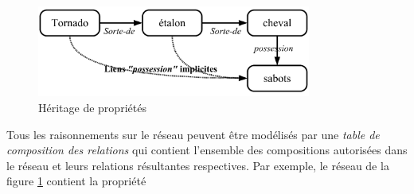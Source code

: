 \begin{figure}[htbp]
  \centering\includegraphics[height = 3cm]{2_Etat-art/img/HeritageProprietes}

 \caption{Héritage de propriétés}\label{fig:heritageProprietes}
\end{figure}


Tous les raisonnements sur le réseau peuvent être modélisés par une
\emph{table de composition des relations} qui contient l'ensemble des
compositions autorisées dans le réseau et leurs relations résultantes
respectives. Par exemple, le réseau de la figure
\ref{fig:heritageProprietes} contient la propriété
